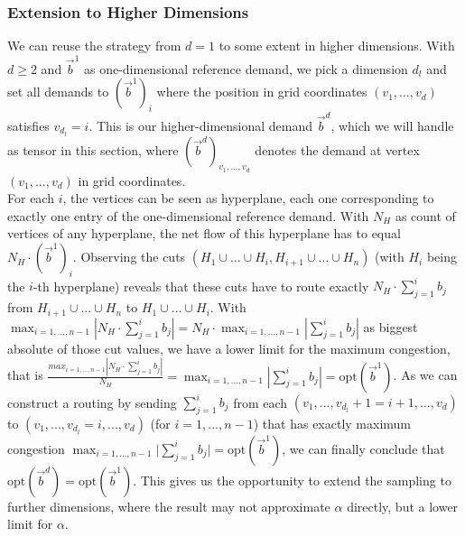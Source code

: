 \subsubsection{Extension to Higher Dimensions}
We can reuse the strategy from $d=1$ to some extent in higher dimensions. With $d\geq 2$ and $\vec{b}^1$ as one-dimensional reference demand, we pick a dimension $d_l$ and set all demands to $(\vec{b}^1)_i$ where the position in grid coordinates $(v_1,...,v_d)$ satisfies $v_{d_l}=i$. This is our higher-dimensional demand $\vec{b}^d$, which we will handle as tensor in this section, where $(\vec{b}^d)_{v_1,...,v_d}$ denotes the demand at vertex $(v_1,...,v_d)$ in grid coordinates. \\
For each $i$, the vertices can be seen as hyperplane, each one corresponding to exactly one entry of the one-dimensional reference demand. With $N_H$ as count of vertices of any hyperplane, the net flow of this hyperplane has to equal $N_H\cdot (\vec{b}^1)_i$. Observing the cuts $(H_1\cup ...\cup H_i,H_{i+1}\cup ...\cup H_n)$ (with $H_i$ being the $i$-th hyperplane) reveals that these cuts have to route exactly $N_H\cdot \sum_{j=1}^ib_j$ from $H_{i+1}\cup ...\cup H_n$ to $H_1\cup ...\cup H_i$. With $\max_{i=1,...,n-1}\left\vert N_H\cdot \sum_{j=1}^ib_j\right\vert=N_H\cdot \max_{i=1,...,n-1}\left\vert \sum_{j=1}^ib_j\right\vert$ as biggest absolute of those cut values, we have a lower limit for the maximum congestion, that is $\frac{max_{i=1,...,n-1}\left\vert N_H\cdot \sum_{j=1}^ib_j\right\vert}{N_H}=\max_{i=1,...,n-1}\left\vert \sum_{j=1}^ib_j\right\vert=\text{opt}(\vec{b}^1)$. As we can construct a routing by sending $\sum_{j=1}^ib_j$ from each $(v_1,...,v_{d_l}+1=i+1,...,v_d)$ to $(v_1,...,v_{d_l}=i,...,v_d)$ (for $i=1,...,n-1$) that has exactly maximum congestion $\max_{i=1,...,n-1} \vert \sum_{j=1}^ib_j\vert =\text{opt}(\vec{b}^1)$, we can finally conclude that $\text{opt}(\vec{b}^d)=\text{opt}(\vec{b}^1)$. This gives us the opportunity to extend the sampling to further dimensions, where the result may not approximate $\alpha$ directly, but a lower limit for $\alpha$.

